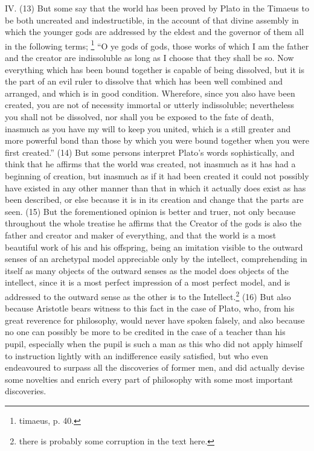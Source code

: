 IV. (13) But some say that the world has been proved by Plato in the Timaeus to be both uncreated
and indestructible, in the account of that divine assembly in which the younger gods are addressed
by the eldest and the governor of them all in the following terms; \footnote{timaeus, p. 40.} ``O ye gods of
gods, those works of which I am the father and the creator are indissoluble as long as I choose
that they shall be so. Now everything which has been bound together is capable of being dissolved,
but it is the part of an evil ruler to dissolve that which has been well combined and arranged, and
which is in good condition. Wherefore, since you also have been created, you are not of necessity
immortal or utterly indissoluble; nevertheless you shall not be dissolved, nor shall you be exposed
to the fate of death, inasmuch as you have my will to keep you united, which is a still greater and
more powerful bond than those by which you were bound together when you were first created.''
(14) But some persons interpret Plato's words sophistically, and think that he affirms that the world
was created, not inasmuch as it has had a beginning of creation, but inasmuch as if it had been
created it could not possibly have existed in any other manner than that in which it actually does
exist as has been described, or else because it is in its creation and change that the parts are
seen. (15) But the forementioned opinion is better and truer, not only because throughout the
whole treatise he affirms that the Creator of the gods is also the father and creator and maker of
everything, and that the world is a most beautiful work of his and his offspring, being an imitation
visible to the outward senses of an archetypal model appreciable only by the intellect,
comprehending in itself as many objects of the outward senses as the model does objects of the
intellect, since it is a most perfect impression of a most perfect model, and is addressed to the
outward sense as the other is to the Intellect.\footnote{there is probably some corruption in the text here.} (16) But
also because Aristotle bears witness to this fact in the case of Plato, who, from his great
reverence for philosophy, would never have spoken falsely, and also because no one can possibly
be more to be credited in the case of a teacher than his pupil, especially when the pupil is such a
man as this who did not apply himself to instruction lightly with an indifference easily satisfied, but
who even endeavoured to surpass all the discoveries of former men, and did actually devise some
novelties and enrich every part of philosophy with some most important discoveries.

